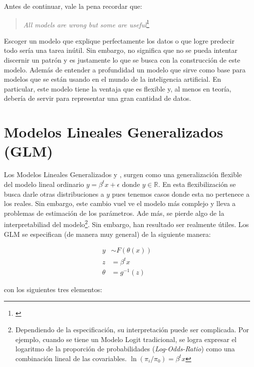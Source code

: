 \documentclass[../Main/Main.tex]{subfiles}
\begin{document}
Antes de continuar, vale la pena recordar que:
\begin{quote}
\textit{All models are wrong but some are useful}\footnote{\autocite{box1979robustnessinthe}}
\end{quote}

Escoger un modelo que explique perfectamente los datos o que logre predecir todo sería una tarea inútil. Sin embargo, no significa que no se pueda intentar discernir un patrón y es justamente lo que se busca con la construcción de este modelo. Además de entender a profundidad un modelo que sirve como base para modelos que se están usando en el mundo de la inteligencia artificial. En particular, este modelo tiene la ventaja que es flexible y, al menos en teoría, debería de servir para representar una gran cantidad de datos.

\section{Modelos Lineales Generalizados (GLM)} \label{sec:GLM}
Los Modelos Lineales Generalizados \autocite{sundberg2016exponential} y \autocite{maccullagh1989generalized}, surgen como una generalización flexible del modelo lineal ordinario $y = \beta^tx + \epsilon$ donde $y\in\mathbb{R}$. En esta flexibilización  se busca darle otras distribuciones a $y$ pues tenemos casos donde esta no pertenece a los reales. Sin embargo, este cambio vuel
ve el modelo más complejo y lleva a problemas de estimación de los parámetros. Ade más, se pierde algo de la interpretabiliad del modelo\footnote{Dependiendo de la especificación, su interpretación puede ser complicada. Por ejemplo, cuando se tiene un Modelo Logit tradicional, se logra expresar el logaritmo de la proporción de probabilidades (\textit{Log-Odds-Ratio}) como una combinación lineal de las covariables. $\ln(\pi_i / \pi_0) = \beta^t x$}. Sin embargo, han resultado ser realmente útiles. Los GLM se especifican (de manera muy general) de la siguiente manera:

\begin{align*}
	y &\sim F(\theta(x)) \\
	z &= \beta^tx \\
	\theta &= g^{-1}(z) 
\end{align*}

con los siguientes tres elementos:
\end{document}
